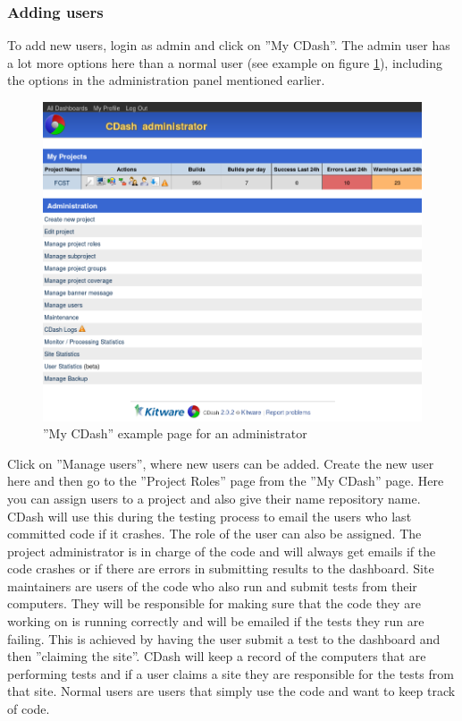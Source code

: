 \subsubsection{Adding users}

To add new users, login as admin and click on ''My CDash''. The admin user has a lot more options here than a normal user (see example on figure \ref{fig:my_cdash}), including the options in the administration panel mentioned earlier. 

\begin{figure}[!h]
\centering
\includegraphics[width=1\textwidth]{figures/CDash/my_cdash.png}
\caption{''My CDash'' example page for an administrator}
\label{fig:my_cdash}
\end{figure}

Click on ''Manage users'', where new users can be added. Create the new user here and then go to the ''Project Roles'' page from the ''My CDash'' page. Here you can assign users to a project and also give their name repository name. CDash will use this during the testing process to email the users who last committed code if it crashes. The role of the user can also be assigned. The project administrator is in charge of the code and will always get emails if the code crashes or if there are errors in submitting results to the dashboard. Site maintainers are users of the code who also run and submit tests from their computers. They will be responsible for making sure that the code they are working on is running correctly and will be emailed if the tests they run are failing. This is achieved by having the user submit a test to the dashboard and then ''claiming the site''. CDash will keep a record of the 
computers that are performing tests and if a user claims a site they are responsible for the tests from that site. Normal users are users that simply use the code and want to keep track of code. 


